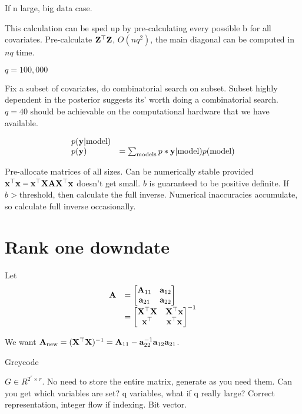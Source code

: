 \documentclass{amsart}
\begin{document}
If n large, big data case.

This calculation can be sped up by pre-calculating every possible b for all covariates.
Pre-calculate ${\bf Z}^\top {\bf Z}$, $O(nq^2)$, the main diagonal can be computed in $nq$ time.

$q = 100,000$

Fix a subset of covariates, do combinatorial search on subset.
Subset highly dependent in the posterior suggests its' worth doing a combinatorial search.
$q = 40$ should be achievable on the computational hardware that we have available.

\begin{equation*}
\begin{array}{ll}
p({\bf y} | \text{model}) & \\
p({\bf y}) &= \sum_{\text{models}} p*{\bf y} | \text{model}) p(\text{model})
\end{array}
\end{equation*}

Pre-allocate matrices of all sizes.
Can be numerically stable provided ${\bf x}^\top {\bf x} - {\bf x}^\top {\bf X} {\bf A} {\bf X}^\top {\bf x}$ doesn't get small.
$b$ is guaranteed to be positive definite.
If $b > \text{threshold}$, then calculate the full inverse.
Numerical inaccuracies accumulate, so calculate full inverse occasionally.

\section{Rank one downdate}

Let
\begin{equation*}
\begin{array}{ll}
{\bf A} &= \begin{bmatrix}
{\bf A}_{11} & {\bf a}_{12} \\
{\bf a}_{21} & {\bf a}_{22}
\end{bmatrix} \\
&= \begin{bmatrix}
{\bf X}^\top {\bf X} & {\bf X}^\top {\bf x} \\
{\bf x}^\top & {\bf x}^\top {\bf x}
\end{bmatrix}^{-1}
\end{array}
\end{equation*}

We want ${\bf A}_{\text{new}} = ({\bf X}^\top {\bf X})^{-1} = {\bf A}_{11} - {\bf a}_{22}^{-1} {\bf a}_{12} {\bf a}_{21}$.

Greycode

$G \in R^{2^r \times r}$. No need to store the entire matrix, generate as you need them. Can you get which
variables are set? q variables, what if q really large? Correct representation, integer flow if indexing. Bit
vector.
\end{document}
